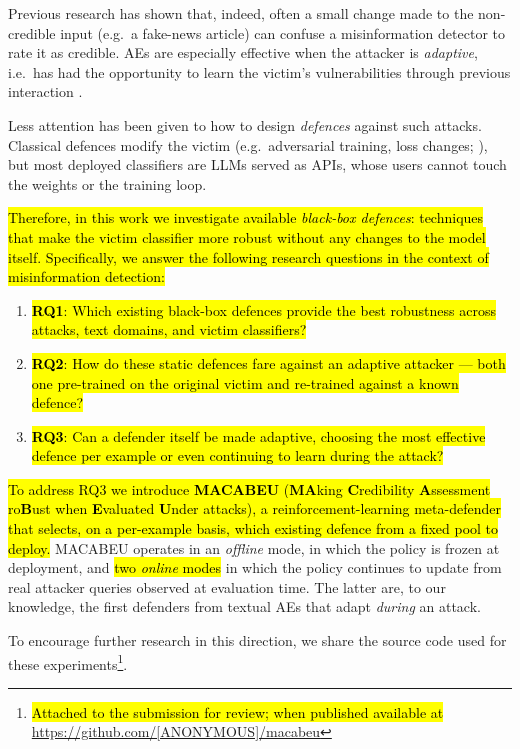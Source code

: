 \documentclass[11pt]{article}
\begin{document}
Previous research \cite{verifying_robustness} has shown that, indeed, often a small change made to the non-credible input (e.g.\ a fake-news article) can confuse a misinformation detector to rate it as credible. AEs are especially effective when the attacker is \textit{adaptive}, i.e.\ has had the opportunity to learn the victim's vulnerabilities through previous interaction \citep{przybyla-etal-2024-know}.

Less attention has been given to how to design \textit{defences} against such attacks. Classical defences modify the victim (e.g.\ adversarial training, loss changes; \citealp{Goyal2023survey}), but most deployed classifiers are LLMs served as APIs, whose users cannot touch the weights or the training loop.

\hl{Therefore, in this work we investigate available \textit{black-box defences}: techniques that make the victim classifier more robust without any changes to the model itself. Specifically, we answer the following research questions in the context of misinformation detection:}
\begin{enumerate}
    \item \hl{\textbf{RQ1}: Which existing black-box defences provide the best robustness across attacks, text domains, and victim classifiers?}
    \item \hl{\textbf{RQ2}: How do these static defences fare against an adaptive attacker --- both one pre-trained on the original victim and re-trained against a known defence?}
    \item \hl{\textbf{RQ3}: Can a defender itself be made adaptive, choosing the most effective defence per example or even continuing to learn during the attack?}
\end{enumerate}

\hl{To address RQ3 we introduce \textbf{MACABEU} (\textbf{MA}king \textbf{C}redibility \textbf{A}ssessment ro\textbf{B}ust when \textbf{E}valuated \textbf{U}nder attacks), a reinforcement-learning meta-defender that selects, on a per-example basis, which existing defence from a fixed pool to deploy.} MACABEU operates in an \emph{offline} mode, in which the policy is frozen at deployment, and \hl{two \emph{online} modes} in which the policy continues to update from real attacker queries observed at evaluation time. The latter are, to our knowledge, the first defenders from textual AEs that adapt \emph{during} an attack.

To encourage further research in this direction, we share the source code used for these experiments\footnote{\hl{Attached to the submission for review; when published available at} \url{https://github.com/[ANONYMOUS]/macabeu}}.
\end{document}
